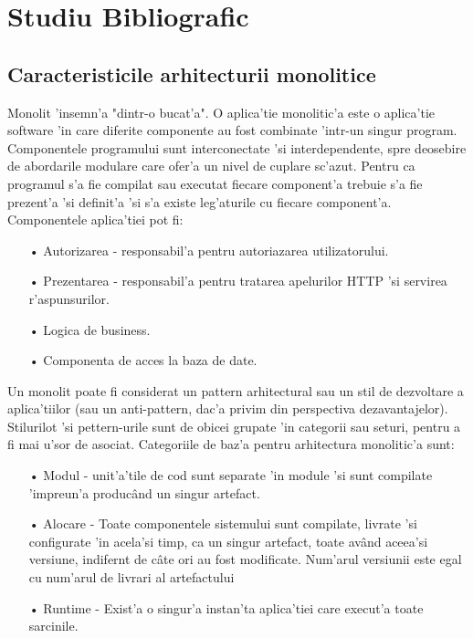 \documentclass[12pt,a4paper,twoside]{report}
\begin{document}
\chapter{Studiu Bibliografic}
\section{Caracteristicile  arhitecturii monolitice}
Monolit 'insemn'a "dintr-o bucat'a". O aplica'tie monolitic'a este o aplica'tie software 'in care diferite componente au fost combinate 'intr-un singur program. Componentele programului sunt interconectate 'si interdependente, spre deosebire de abordarile modulare care ofer'a un nivel de cuplare sc'azut. Pentru ca programul s'a fie compilat sau executat fiecare component'a trebuie s'a fie prezent'a 'si definit'a 'si s'a existe leg'aturile cu fiecare component'a. Componentele aplica'tiei pot fi:
\begin{itemize}
\item[•]Autorizarea - responsabil'a pentru autoriazarea utilizatorului.\item[•]Prezentarea - responsabil'a pentru tratarea apelurilor HTTP 'si servirea r'aspunsurilor.
 \item[•]Logica de business. 
\item[•]Componenta de acces la baza de date.
\end{itemize}
Un monolit poate fi considerat un pattern arhitectural sau un stil de dezvoltare a aplica'tiilor (sau un anti-pattern, dac'a privim din perspectiva dezavantajelor). Stilurilot 'si pettern-urile sunt de obicei grupate 'in categorii sau seturi, pentru a fi mai u'sor de asociat. Categoriile de baz'a pentru arhitectura monolitic'a sunt:
\begin{itemize}
\item[•] Modul - unit'a'tile de cod sunt separate 'in module 'si sunt compilate 'impreun'a producând un singur artefact.
\item[•] Alocare - Toate componentele sistemului sunt compilate, livrate 'si configurate 'in acela'si timp, ca un singur artefact, toate având aceea'si versiune, indifernt de câte ori au fost modificate. Num'arul versiunii este egal cu num'arul de livrari al artefactului
\item[•] Runtime - Exist'a o singur'a instan'ta aplica'tiei care execut'a toate sarcinile.
\end{itemize}
\end{document}
